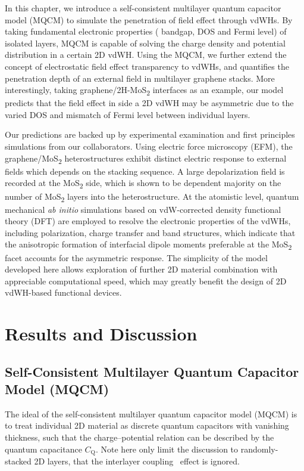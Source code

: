 In this chapter, we introduce a self-consistent multilayer quantum
capacitor model (MQCM) to simulate the penetration of field effect
through vdWHs. By taking fundamental electronic properties (\eg
bandgap, DOS and Fermi level) of isolated layers, MQCM is capable of
solving the charge density and potential distribution in a certain 2D
vdWH.
%
Using the MQCM, we further extend the concept of electrostatic field
effect transparency to vdWHs, and quantifies the penetration depth of
an external field in multilayer graphene stacks.
%
More interestingly, taking graphene/2H-MoS\textsubscript{2} interfaces
as an example, our model predicts that the field effect in side a 2D
vdWH may be asymmetric due to the varied DOS and mismatch of
Fermi level between individual layers.
%

Our predictions are backed up by experimental examination and first
principles simulations from our collaborators.
%
Using electric force microscopy (EFM), the
graphene/MoS\textsubscript{2} heterostructures exhibit distinct
electric response to external fields which depends on the stacking
sequence.
%
A large depolarization field is recorded at the
MoS\textsubscript{2} side, which is shown to be dependent majority
on the number of MoS\textsubscript{2} layers into the
heterostructure.
%
At the atomistic level, quantum mechanical \textit{ab initio}
simulations based on vdW-corrected density functional theory (DFT) are
employed to resolve the electronic properties of the vdWHs, including
polarization, charge transfer and band structures,
%
which indicate that
the anisotropic formation of interfacial dipole moments preferable at
the MoS\textsubscript{2} facet accounts for the asymmetric
response.
%
The simplicity of the model developed here allows exploration of
further 2D material combination with appreciable computational speed,
which may greatly benefit the design of 2D vdWH-based functional
devices.

\section{Results and Discussion}
\label{sec:asym-results}


\subsection{Self-Consistent Multilayer Quantum Capacitor Model (MQCM)}
\label{sec:asym-model}

The ideal of the self-consistent multilayer quantum capacitor model
(MQCM) is to treat individual 2D material as discrete quantum
capacitors with vanishing thickness, such that the charge--potential
relation can be described by the quantum capacitance $C_{\mathrm{Q}}$.
%
Note here only limit the discussion to randomly-stacked 2D layers,
that the interlayer coupling~\cite{Fang_2014_intercoupl_vdW} effect is
ignored.

